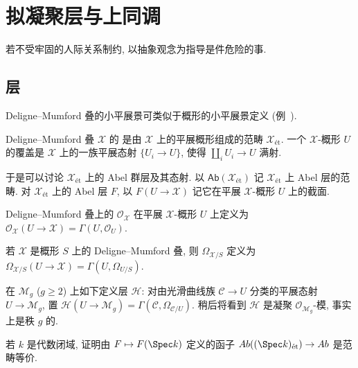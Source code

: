 \section{拟凝聚层与上同调}\label{src:5.1}
\begin{epigraph}
若不受牢固的人际关系制约, 以抽象观念为指导是件危险的事.
\end{epigraph}

\subsection{层}\label{src:5.1.1-subsection}
Deligne--Mumford 叠的小平展景可类似于概形的小平展景定义 (例~).
\begin{definition}\label{src:5.1.1}
Deligne--Mumford 叠 $\mathcal X$ 的 是由 $\mathcal X$ 上的平展概形组成的范畴 $\mathcal X_{\text{ét}}$. 一个 $\mathcal X$-概形 $U$ 的覆盖是 $\mathcal X$ 上的一族平展态射 $\{U_i\to U\}$, 使得 $\coprod_i U_i\to U$ 满射.
\end{definition}
于是可以讨论 $\mathcal X_{\text{ét}}$ 上的 Abel 群层及其态射. 以 $\mathsf{Ab}(\mathcal X_{\text{ét}})$ 记 $\mathcal X_{\text{ét}}$ 上 Abel 层的范畴. 对 $\mathcal X_{\text{ét}}$ 上的 Abel 层 $F$, 以 $F(U\to\mathcal X)$ 记它在平展 $\mathcal X$-概形 $U$ 上的截面.
\begin{example}[结构层]\label{src:5.1.2}
Deligne--Mumford 叠上的 $\mathcal O_{\mathcal X}$ 在平展 $\mathcal X$-概形 $U$ 上定义为 $\mathcal O_{\mathcal X}(U\to\mathcal X)=\Gamma(U,\mathcal O_U)$.
\end{example}
\begin{example}[微分]\label{src:5.1.3}
若 $\mathcal X$ 是概形 $S$ 上的 Deligne--Mumford 叠, 则 $\Omega_{\mathcal X/S}$ 定义为 $\Omega_{\mathcal X/S}(U\to\mathcal X)=\Gamma(U,\Omega_{U/S})$.
\end{example}
\begin{example}[Hodge 丛]\label{src:5.1.4}
在 $\mathcal M_g$ ($g\geq2$) 上如下定义层 $\mathcal H$: 对由光滑曲线族 $\mathcal C\to U$ 分类的平展态射 $U\to\mathcal M_g$, 置 $\mathcal H(U\to\mathcal M_g)=\Gamma(\mathcal C,\Omega_{\mathcal C/U})$. 稍后将看到 $\mathcal H$ 是凝聚 $\mathcal O_{\mathcal M_g}$-模, 事实上是秩 $g$ 的.
\end{example}
\begin{exercise}[简单]\label{src:5.1.5}
若 $k$ 是代数闭域, 证明由 $F\mapsto F(\Spec k)$ 定义的函子 $\mathsf{Ab}((\Spec k)_{\text{ét}})\to\mathsf{Ab}$ 是范畴等价.
\end{exercise}
